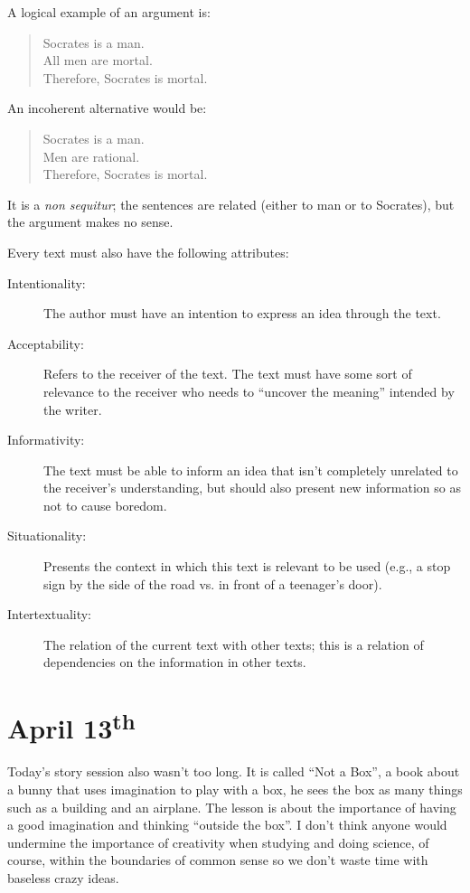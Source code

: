A logical example of an argument is:
\begin{quote}
    Socrates is a man.\\
    All men are mortal.\\
    Therefore, Socrates is mortal.
\end{quote}

An incoherent alternative would be:
\begin{quote}
    Socrates is a man.\\
    Men are rational.\\
    Therefore, Socrates is mortal.
\end{quote}

It is a \textit{non sequitur}; the sentences are related (either to man or to Socrates), but the argument makes no sense.

Every text must also have the following attributes:
\begin{description}
    \item[Intentionality:] The author must have an intention to express an idea through the text.
    \item[Acceptability:] Refers to the receiver of the text. The text must have some sort of relevance to the receiver who needs to ``uncover the meaning'' intended by the writer.
    \item[Informativity:] The text must be able to inform an idea that isn't completely unrelated to the receiver's understanding, but should also present new information so as not to cause boredom.
    \item[Situationality:] Presents the context in which this text is relevant to be used (e.g., a stop sign by the side of the road vs. in front of a teenager's door).
    \item[Intertextuality:] The relation of the current text with other texts; this is a relation of dependencies on the information in other texts.
\end{description}

\section[April 13th]{April 13\textsuperscript{th}}

Today's story session also wasn't too long. It is called ``Not a Box'', a book about a bunny that uses imagination to play with a box, he sees the box as many things such as a building and an airplane. The lesson is about the importance of having a good imagination and thinking ``outside the box''. I don't think anyone would undermine the importance of creativity when studying and doing science, of course, within the boundaries of common sense so we don't waste time with baseless crazy ideas.

